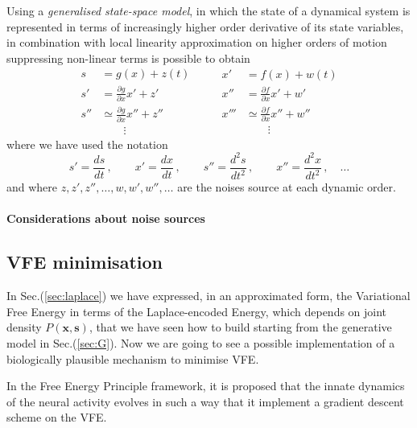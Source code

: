 \documentclass[a4paper, 10pt]{article}
\begin{document}
Using a \emph{generalised state-space model}, in which the state of a dynamical system is represented in terms of increasingly higher order derivative of its state variables, in combination with local linearity approximation on higher orders of motion suppressing non-linear terms is possible to obtain 
\begin{equation}
  \begin{split}
    s &= g(x) + z(t) \\
    s' &= \frac{\partial g}{\partial x}x' + z' \\
    s'' & \simeq \frac{\partial g}{\partial x}x'' + z''\\
    				& \qquad \vdots
  \end{split}
  \qquad
  \begin{split}
    x' &= f(x) + w(t) \\
    x'' &= \frac{\partial f}{\partial x}x' + w' \\
    x''' & \simeq \frac{\partial f}{\partial x}x'' + w''\\
    				& \qquad \vdots
  \end{split}
\end{equation}
where we have used the notation
\begin{equation}
s' = \frac{ds}{dt} \, , \qquad x'=\frac{dx}{dt} \, , \qquad s''= \frac{d^2 s}{dt^2} \, , \qquad x''= \frac{d^2 x}{dt^2} \, , \quad \dots
\end{equation}
and where $z,z',z'',\dots, w,w',w'',\dots$ are the noises source at each dynamic order.
\paragraph{Considerations about noise sources}




\subsection{VFE minimisation}
In Sec.(\ref{sec:laplace}) we have expressed, in an approximated form, the Variational Free Energy in terms of the Laplace-encoded Energy, which depends on joint density $P(\mathbf x, \mathbf s)$, that we have seen how to build starting from the generative model in Sec.(\ref{sec:G}). Now we are going to see a possible implementation of a biologically plausible mechanism to minimise VFE.

In the Free Energy Principle framework, it is proposed that the innate dynamics of the neural activity evolves in such a way that it implement a gradient descent scheme on the VFE. 
\end{document}
